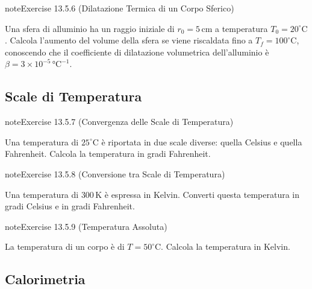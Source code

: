 \documentclass[letterpaper,10pt,italian]{jupyterBook}
\begin{document}
\begin{sphinxadmonition}{note}{Exercise 13.5.6 (Dilatazione Termica di un Corpo Sferico)}



\sphinxAtStartPar
Una sfera di alluminio ha un raggio iniziale di \(r_0 = 5 \, \text{cm}\) a temperatura \(T_0 = 20^\circ \text{C}\). Calcola l’aumento del volume della sfera se viene riscaldata fino a \(T_f = 100^\circ \text{C}\), conoscendo che il coefficiente di dilatazione volumetrica dell’alluminio è \(\beta = 3 \times 10^{-5} \, \text{°C}^{-1}\).
\end{sphinxadmonition}


\subsection{Scale di Temperatura}
\label{\detokenize{ch/thermodynamics/foundation-problems:scale-di-temperatura}} \label{exercise:ch/thermodynamics/foundation-problems-exercise-6}

\begin{sphinxadmonition}{note}{Exercise 13.5.7 (Convergenza delle Scale di Temperatura)}



\sphinxAtStartPar
Una temperatura di \(25^\circ \text{C}\) è riportata in due scale diverse: quella Celsius e quella Fahrenheit. Calcola la temperatura in gradi Fahrenheit.
\end{sphinxadmonition}
 \label{exercise:ch/thermodynamics/foundation-problems-exercise-7}

\begin{sphinxadmonition}{note}{Exercise 13.5.8 (Conversione tra Scale di Temperatura)}



\sphinxAtStartPar
Una temperatura di \(300 \, \text{K}\) è espressa in Kelvin. Converti questa temperatura in gradi Celsius e in gradi Fahrenheit.
\end{sphinxadmonition}
 \label{exercise:ch/thermodynamics/foundation-problems-exercise-8}

\begin{sphinxadmonition}{note}{Exercise 13.5.9 (Temperatura Assoluta)}



\sphinxAtStartPar
La temperatura di un corpo è di \(T = 50^\circ \text{C}\). Calcola la temperatura in Kelvin.
\end{sphinxadmonition}


\subsection{Calorimetria}
\label{\detokenize{ch/thermodynamics/foundation-problems:id1}} \label{exercise:ch/thermodynamics/foundation-problems-exercise-9}
\end{document}

